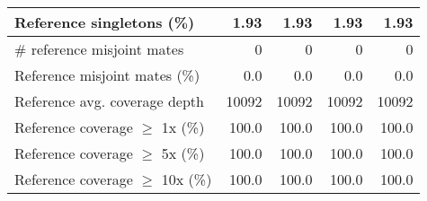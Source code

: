 \documentclass[12pt,a4paper]{article}
\begin{document}
\begin{table}[ht]
\begin{center}
\begin{tabular}{|l*{4}{|r}|}
Reference singletons (\%) & 1.93 & 1.93 & 1.93 & 1.93 \\ \hline
\# reference misjoint mates & 0 & 0 & 0 & 0 \\ \hline
Reference misjoint mates (\%) & 0.0 & 0.0 & 0.0 & 0.0 \\ \hline
Reference avg. coverage depth & 10092 & 10092 & 10092 & 10092 \\ \hline
Reference coverage $\geq$ 1x (\%) & 100.0 & 100.0 & 100.0 & 100.0 \\ \hline
Reference coverage $\geq$ 5x (\%) & 100.0 & 100.0 & 100.0 & 100.0 \\ \hline
Reference coverage $\geq$ 10x (\%) & 100.0 & 100.0 & 100.0 & 100.0 \\ \hline
\end{tabular}
\end{center}
\end{table}
\end{document}
